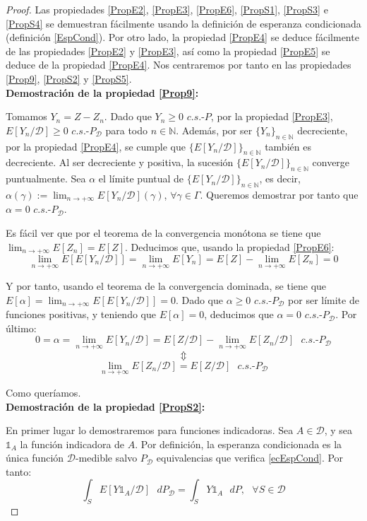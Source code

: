 \begin{proof}
Las propiedades \ref{PropE2}, \ref{PropE3}, \ref{PropE6}, \ref{PropS1}, \ref{PropS3} e \ref{PropS4} se demuestran fácilmente usando la definición de esperanza condicionada (definición \ref{EspCond}). Por otro lado, la propiedad \ref{PropE4} se deduce fácilmente de las propiedades \ref{PropE2} y \ref{PropE3}, así como la propiedad \ref{PropE5} se deduce de la propiedad \ref{PropE4}. Nos centraremos por tanto en las propiedades \ref{Prop9}, \ref{PropS2} y \ref{PropS5}.\\

\textbf{Demostración de la propiedad \ref{Prop9}:}

Tomamos $Y_n=Z-Z_n$. Dado que $Y_n\geq 0$ $c.s.\text{-}P$, por la propiedad \ref{PropE3}, $E[Y_n/\mathcal{D}]\geq 0$ $c.s.\text{-}P_{\mathcal{D}}$ para todo $n\in\mathds{N}$. Además, por ser $\{Y_n\}_{n\in\mathds{N}}$ decreciente, por la propiedad \ref{PropE4}, se cumple que $\{E[Y_n/\mathcal{D}]\}_{n\in\mathds{N}}$ también es decreciente. Al ser decreciente y positiva, la sucesión $\{E[Y_n/\mathcal{D}]\}_{n\in\mathds{N}}$ converge puntualmente. Sea $\alpha$ el límite puntual de $\{E[Y_n/\mathcal{D}]\}_{n\in\mathds{N}}$, es decir, $\alpha(\gamma):=\lim_{n\to +\infty}E[Y_n/\mathcal{D}](\gamma)$, $\forall \gamma\in\Gamma$. Queremos demostrar por tanto que $\alpha = 0$ $c.s.\text{-}P_{\mathcal{D}}$.

Es fácil ver que por el teorema de la convergencia monótona se tiene que $\lim_{n\to +\infty}E[Z_n] = E[Z]$. Deducimos que, usando la propiedad \ref{PropE6}:
$$\lim_{n\to +\infty}E[E[Y_n/\mathcal{D}]] = \lim_{n\to +\infty}E[Y_n] = E[Z] - \lim_{n\to +\infty}E[Z_n] = 0$$

Y por tanto, usando el teorema de la convergencia dominada, se tiene que $E[\alpha] = \lim_{n\to +\infty}E[E[Y_n/\mathcal{D}]] = 0$. Dado que $\alpha \geq 0$ $c.s.\text{-}P_{\mathcal{D}}$ por ser límite de funciones positivas, y teniendo que $E[\alpha] = 0$, deducimos que $\alpha = 0$ $c.s.\text{-}P_{\mathcal{D}}$. Por último:
$$0 = \alpha = \lim_{n\to +\infty}E[Y_n/\mathcal{D}] = E[Z/\mathcal{D}] - \lim_{n\to +\infty} E[Z_n/\mathcal{D}] \text{ } c.s.\text{-}P_{\mathcal{D}} $$
$$\Updownarrow$$
$$ \lim_{n\to +\infty} E[Z_n/\mathcal{D}] =  E[Z/\mathcal{D}] \text{ } c.s.\text{-}P_{\mathcal{D}}$$

Como queríamos.\\


\textbf{Demostración de la propiedad \ref{PropS2}:}

En primer lugar lo demostraremos para funciones indicadoras. Sea $A\in \mathcal{D}$, y sea $\mathds{1}_A$ la función indicadora de $A$. Por definición, la esperanza condicionada es la única función $\mathcal{D}$-medible salvo $P_{\mathcal{D}}$ equivalencias que verifica \ref{ecEspCond}. Por tanto:
$$\int _S E[Y\mathds{1}_A/\mathcal{D}]\text{ }dP_{\mathcal{D}} = \int_S Y\mathds{1}_A\text{ }dP,\text{ }\forall S\in\mathcal{D}$$


\end{proof}
